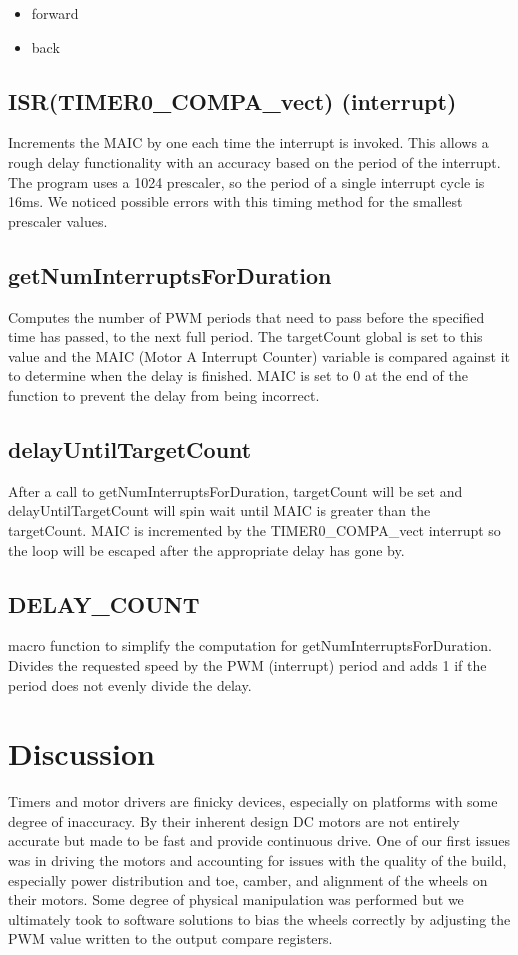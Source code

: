 \documentclass[letterpaper,11pt]{texMemo} %
\begin{document}
\begin{itemize}
    \item forward
    \item back
\end{itemize}

\subsection*{ISR(TIMER0\_COMPA\_vect) (interrupt)}
Increments the MAIC by one each time the interrupt is invoked. This allows a rough delay functionality with an accuracy based on the period of the interrupt. The program uses a 1024 prescaler, so the period of a single interrupt cycle is 16ms. We noticed possible errors with this timing method for the smallest prescaler values.

\subsection*{getNumInterruptsForDuration}
Computes the number of PWM periods that need to pass before the specified time has passed, to the next full period. The targetCount global is set to this value and the MAIC (Motor A Interrupt Counter) variable is compared against it to determine when the delay is finished. MAIC is set to 0 at the end of the function to prevent the delay from being incorrect.

\subsection*{delayUntilTargetCount}
After a call to getNumInterruptsForDuration, targetCount will be set and delayUntilTargetCount will spin wait until MAIC is greater than the targetCount. MAIC is incremented by the TIMER0\_COMPA\_vect interrupt so the loop will be escaped after the appropriate delay has gone by.

\subsection*{DELAY\_COUNT}
macro function to simplify the computation for getNumInterruptsForDuration. Divides the requested speed by the PWM (interrupt) period and adds 1 if the period does not evenly divide the delay.

\section*{Discussion}
Timers and motor drivers are finicky devices, especially on platforms with 
some degree of inaccuracy. By their inherent design DC motors are not entirely 
accurate but made to be fast and provide continuous drive. One of our first 
issues was in driving the motors and accounting for issues with the quality 
of the build, especially power distribution and toe, camber, and alignment of 
the wheels on their motors. Some degree of physical manipulation was performed 
but we ultimately took to software solutions to bias the wheels correctly by 
adjusting the PWM value written to the output compare registers.
\end{document}
